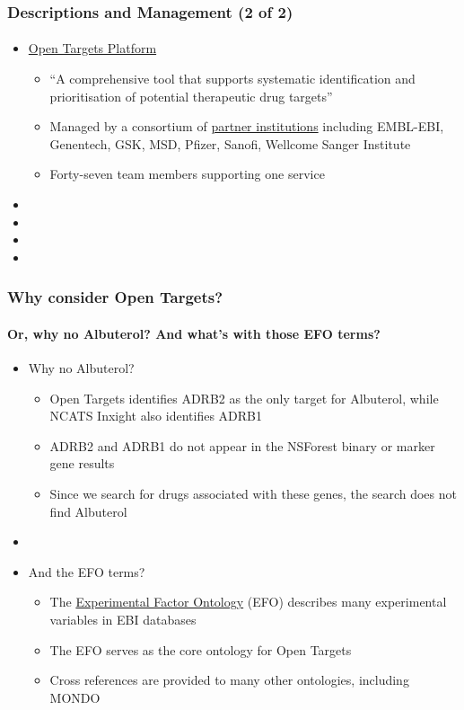 \documentclass[aspectratio=169,xcolor=dvipsnames]{beamer}
\begin{document}
\begin{frame}
  \frametitle{Descriptions and Management (2 of 2)}
  \framesubtitle{}
  \begin{itemize}
  \item[]
    \href{https://platform-docs.opentargets.org/getting-started}{Open
      Targets Platform}
    \begin{itemize}
    \item ``A comprehensive tool that supports systematic
      identification and prioritisation of potential therapeutic drug
      targets''
    \item Managed by a consortium of
      \href{https://www.opentargets.org/partners}{partner
        institutions} including EMBL-EBI, Genentech, GSK, MSD, Pfizer,
      Sanofi, Wellcome Sanger Institute
    \item Forty-seven team members supporting one service
    \end{itemize}
  \item[]
  \item[]
  \item[]
  \item[]
  \end{itemize}
\end{frame}

\begin{frame}
  \frametitle{Why consider Open Targets?}
  \framesubtitle{Or, why no Albuterol? And what's with those EFO terms?}
  \begin{itemize}
  \item[] Why no Albuterol?
    \begin{itemize}
    \item Open Targets identifies ADRB2 as the only target for
      Albuterol, while NCATS Inxight also identifies ADRB1
    \item ADRB2 and ADRB1 do not appear in the NSForest binary or
      marker gene results
    \item Since we search for drugs associated with these genes, the
      search does not find Albuterol
    \end{itemize}
  \item[]
  \item[] And the EFO terms?
    \begin{itemize}
    \item The \href{https://www.ebi.ac.uk/efo/}{Experimental Factor
      Ontology} (EFO) describes many experimental variables in EBI
      databases
    \item The EFO serves as the core ontology for Open Targets
    \item Cross references are provided to many other ontologies,
      including MONDO
    \end{itemize}
  \end{itemize}
\end{frame}
\end{document}

